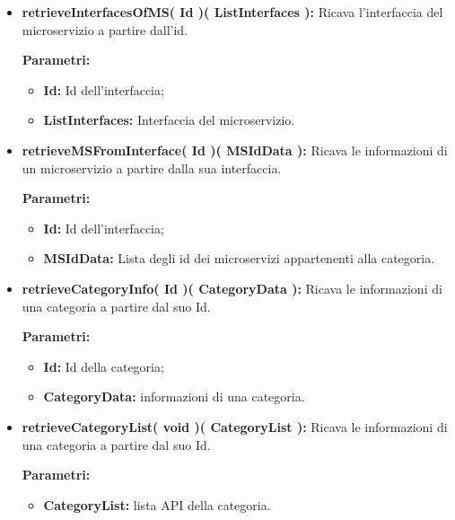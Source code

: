 \begin{itemize}
\begin{itemize}
			\item \textbf{retrieveInterfacesOfMS( Id )( ListInterfaces ):} Ricava l'interfaccia del microservizio a partire dall'id.
				\begin{description}
    				\item[\textbf{Parametri:}]
				\end{description}
				\begin{itemize}
					\item \textbf{Id:} Id dell'interfaccia;
					\item \textbf{ListInterfaces:} Interfaccia del microservizio.
				\end{itemize}
				
			\item \textbf{retrieveMSFromInterface( Id )( MSIdData ):} Ricava le informazioni di un microservizio a partire dalla sua interfaccia.
				\begin{description}
    				\item[\textbf{Parametri:}]
				\end{description}
				\begin{itemize}
					\item \textbf{Id:} Id dell'interfaccia;
					\item \textbf{MSIdData:} Lista degli id dei microservizi appartenenti alla categoria.
				\end{itemize}
			
			\item \textbf{retrieveCategoryInfo( Id )( CategoryData ):} Ricava le informazioni di una categoria a partire dal suo Id.
			\begin{description}
				\item[\textbf{Parametri:}]
			\end{description}
			\begin{itemize}
				\item \textbf{Id:} Id della categoria;
				\item \textbf{CategoryData:} informazioni di una categoria.
			\end{itemize}
				
			\item \textbf{retrieveCategoryList( void )( CategoryList ):} Ricava le informazioni di una categoria a partire dal suo Id.
			\begin{description}
				\item[\textbf{Parametri:}]
			\end{description}
			\begin{itemize}
				\item \textbf{CategoryList:} lista API della categoria.
			\end{itemize}
				

\end{itemize}
\end{itemize}
